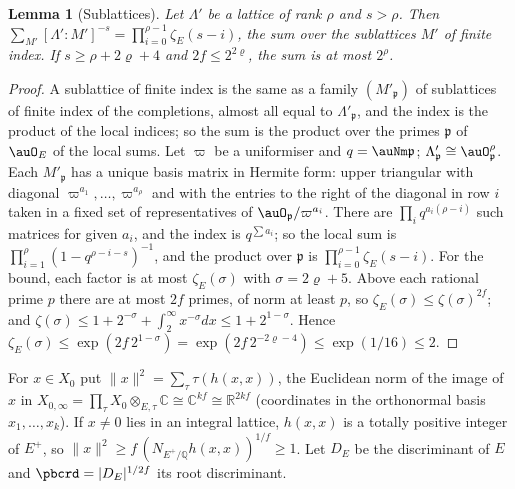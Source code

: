 \documentclass[10pt]{amsart}
\newtheorem{lemma}[theorem]{Lemma}
\theoremstyle{definition}
\theoremstyle{remark}
\newcommand{\C}{\mathbb C}
\newcommand{\R}{\mathbb R}
\newcommand{\Q}{\mathbb Q}
\begin{document}
\begin{lemma}[Sublattices]\label{pbc:zeta}
Let $\Lambda'$ be a lattice of rank $\rho$ and $s>\rho$. Then $\sum_{M'}[\Lambda':M']^{-s}=\prod_{i=0}^{\rho-1}
\zeta_E(s-i)$, the sum over the sublattices $M'$ of finite index. If $s\ge\rho+2\varrho+4$ and $2f\le
2^{2\varrho}$, the sum is at most $2^\rho$.
\end{lemma}
\begin{proof}
A sublattice of finite index is the same as a family $(M'_{\mathfrak p})$ of sublattices of finite index
of the completions, almost all equal to $\Lambda'_{\mathfrak p}$, and the index is the product of the
local indices; so the sum is the product over the primes $\mathfrak p$ of $\auO_E$ of the local sums.
Let $\varpi$ be a uniformiser and $q=\auNm\mathfrak p$; $\Lambda'_{\mathfrak p}\cong\auO_{\mathfrak p}^\rho$.
Each $M'_{\mathfrak p}$ has a unique basis matrix in Hermite form: upper triangular with diagonal
$\varpi^{a_1},\dots,\varpi^{a_\rho}$ and with the entries to the right of the diagonal in row $i$ taken in
a fixed set of representatives of $\auO_{\mathfrak p}/\varpi^{a_i}$. There are $\prod_iq^{a_i(\rho-i)}$ such
matrices for given $a_i$, and the index is $q^{\sum a_i}$; so the local sum is $\prod_{i=1}^\rho(1-q^{
\rho-i-s})^{-1}$, and the product over $\mathfrak p$ is $\prod_{i=0}^{\rho-1}\zeta_E(s-i)$. For the bound,
each factor is at most $\zeta_E(\sigma)$ with $\sigma=2\varrho+5$. Above each rational prime $p$ there are
at most $2f$ primes, of norm at least $p$, so $\zeta_E(\sigma)\le\zeta(\sigma)^{2f}$; and $\zeta(\sigma)\le
1+2^{-\sigma}+\int_2^\infty x^{-\sigma}dx\le1+2^{1-\sigma}$. Hence $\zeta_E(\sigma)\le\exp(2f\,2^{1-\sigma})
=\exp(2f\,2^{-2\varrho-4})\le\exp(1/16)\le2$.
\end{proof}

For $x\in X_0$ put $\|x\|^2=\sum_{\tau}\tau(h(x,x))$, the Euclidean norm of the image of $x$ in $X_{0,
\infty}=\prod_\tau X_0\otimes_{E,\tau}\C\cong\C^{kf}\cong\R^{2kf}$ (coordinates in the orthonormal
basis $x_1,\dots,x_k$). If $x\ne0$ lies in an integral lattice, $h(x,x)$ is a totally positive integer of
$E^+$, so $\|x\|^2\ge f\,(N_{E^+/\Q}h(x,x))^{1/f}\ge1$. Let $D_E$ be the discriminant of $E$ and
$\pbcrd=|D_E|^{1/2f}$ its root discriminant.
\end{document}
